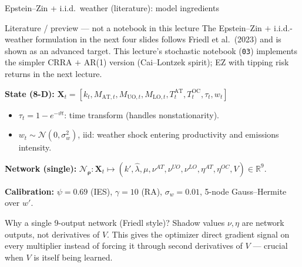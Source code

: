 \documentclass[aspectratio=169,11pt]{beamer}
\newcommand{\emphc}[1]{\textcolor{harvardcrimson}{#1}}
\newcommand{\X}{\bm{X}}
\newcommand{\nn}{\mathcal{N}_{\bm{\rho}}}
\begin{document}
\begin{frame}{Epstein--Zin + i.i.d.\ weather (literature): model ingredients}
\small
\begin{alertblock}{Literature / preview --- not a notebook in this lecture}
\footnotesize The Epstein--Zin $+$ i.i.d.-weather formulation in the next four slides follows Friedl et al.\ (2023) and is shown as an advanced target. This lecture's stochastic notebook (\texttt{03}) implements the simpler \emphc{CRRA $+$ AR(1)} version (Cai--Lontzek spirit); EZ with tipping risk returns in the next lecture.
\end{alertblock}
\textbf{State (8-D):} $\X_t = [k_t, M_{\mathrm{AT},t}, M_{\mathrm{UO},t}, M_{\mathrm{LO},t}, T^{\mathrm{AT}}_t, T^{\mathrm{OC}}_t, \tau_t, w_t]$
\begin{itemize}\setlength\itemsep{0pt}
    \item $\tau_t = 1 - e^{-\vartheta t}$: time transform (handles nonstationarity).
    \item $w_t \sim \mathcal{N}(0,\sigma_w^2)$, iid: weather shock entering productivity and emissions intensity.
\end{itemize}

\textbf{Network (single):} $\nn : \X_t \mapsto (k', \hat\lambda, \mu, \nu^{\!AT}, \nu^{\!UO}, \nu^{\!LO}, \eta^{\!AT}, \eta^{\!OC}, V) \in \mathbb{R}^9$.

\textbf{Calibration:} $\psi = 0.69$ (IES), $\gamma = 10$ (RA), $\sigma_w = 0.01$, 5-node Gauss--Hermite over $w'$.

\vspace{0.15cm}
\begin{exampleblock}{Why a \emphc{single} 9-output network (Friedl style)?}
Shadow values $\nu, \eta$ are network outputs, not derivatives of $V$. This gives the optimizer direct gradient signal on every multiplier instead of forcing it through second derivatives of $V$ --- crucial when $V$ is itself being learned.
\end{exampleblock}
\end{frame}
\end{document}

